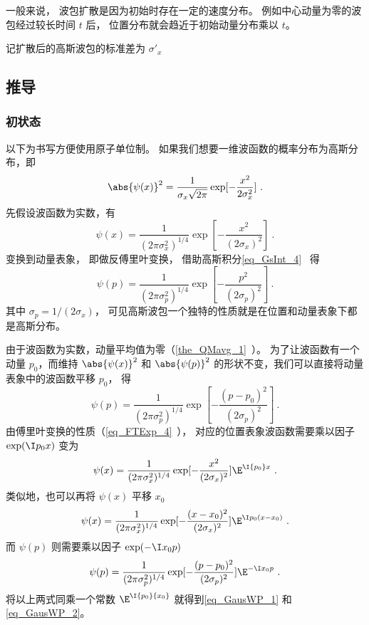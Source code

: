一般来说， 波包扩散是因为初始时存在一定的速度分布。 例如中心动量为零的波包经过较长时间 $t$ 后， 位置分布就会趋近于初始动量分布乘以 $t$。

记扩散后的高斯波包的标准差为 $\sigma'_x$

\subsection{推导}
\subsubsection{初状态}

以下为书写方便使用原子单位制。 如果我们想要一维波函数的概率分布为高斯分布，即
\begin{equation}
\abs{\psi (x)}^2 = \frac{1}{\sigma_x \sqrt{2\pi}} \exp[-\frac{x^2}{2\sigma_x^2}]~.
\end{equation}
先假设波函数为实数，有
\begin{equation}
\psi (x) = \frac{1}{(2\pi\sigma_x^2)^{1/4}} \exp[-\frac{x^2}{(2\sigma_x)^2}]~.
\end{equation}
变换到动量表象， 即做反傅里叶变换， 借助高斯积分\autoref{eq_GsInt_4}~ 得
\begin{equation}
\psi(p) = \frac{1}{(2\pi\sigma_p^2)^{1/4}} \exp[-\frac{p^2}{(2\sigma_p)^2}]~.
\end{equation}
其中 $\sigma_p = 1/(2\sigma_x)$， 可见高斯波包一个独特的性质就是在位置和动量表象下都是高斯分布。

由于波函数为实数，动量平均值为零（\autoref{the_QMavg_1}~）。 为了让波函数有一个动量 $p_0$，而维持 $\abs{\psi(x)}^2$ 和 $\abs{\psi(p)}^2$ %
的形状不变，我们可以直接将动量表象中的波函数平移 $p_0$， 得
\begin{equation}
\psi (p) = \frac{1}{(2\pi\sigma_p^2)^{1/4}} \exp[-\frac{(p - p_0)^2}{(2\sigma_p)^2}]~.
\end{equation}
由傅里叶变换的性质（\autoref{eq_FTExp_4}~）， 对应的位置表象波函数需要乘以因子 $\exp(\I p_0 x)$ 变为
\begin{equation}
\psi(x) = \frac{1}{(2\pi\sigma_x^2)^{1/4}} \exp[-\frac{x^2}{(2\sigma_x)^2}] {\E^{\I {p_0}x}}~.
\end{equation}
类似地，也可以再将 $\psi(x)$ 平移 $x_0$ 
\begin{equation}
\psi (x) = \frac{1}{(2\pi\sigma_x^2)^{1/4}} \exp[-\frac{(x-x_0)^2}{(2\sigma_x)^2}] \E^{\I p_0 (x-x_0)}~.
\end{equation}
而 $\psi(p)$ 则需要乘以因子 $\exp (-\I x_0 p)$
\begin{equation}\label{eq_GausWP_3}
\psi(p) = \frac{1}{(2\pi\sigma_p^2)^{1/4}} \exp[-\frac{(p - p_0)^2}{(2\sigma_p)^2}] \E^{-\I x_0 p}~.
\end{equation}
将以上两式同乘一个常数%
 ${\E^{\I{p_0}{x_0}}}$ 就得到\autoref{eq_GausWP_1} 和\autoref{eq_GausWP_2}。

